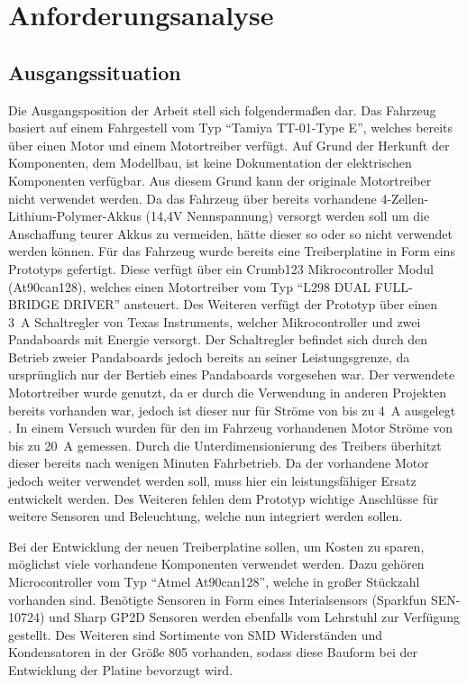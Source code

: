 
\chapter{Anforderungsanalyse}

\section{Ausgangssituation}
Die Ausgangsposition der Arbeit stell sich folgendermaßen dar. Das Fahrzeug basiert auf einem Fahrgestell vom Typ ``Tamiya TT-01-Type E'', welches bereits über einen Motor und einem Motortreiber verfügt.
Auf Grund der Herkunft der Komponenten, dem Modellbau, ist keine
Dokumentation der elektrischen Komponenten verfügbar.
Aus diesem Grund kann der originale Motortreiber nicht verwendet werden.
Da das Fahrzeug über bereits vorhandene 4-Zellen-Lithium-Polymer-Akkus (14,4V Nennspannung) versorgt werden soll um die Anschaffung teurer Akkus zu vermeiden,
hätte dieser so oder so nicht verwendet werden können. 
Für das Fahrzeug wurde bereits eine Treiberplatine in Form eins Prototyps gefertigt.
Diese verfügt über ein Crumb123 Mikrocontroller Modul (At90can128), welches einen Motortreiber vom Typ ``L298 DUAL FULL-BRIDGE DRIVER'' ansteuert.
Des Weiteren verfügt der Prototyp über einen \SI{3}{\A} Schaltregler von Texas Instruments, welcher Mikrocontroller und zwei Pandaboards mit Energie versorgt. 
Der Schaltregler befindet sich durch den Betrieb zweier Pandaboards jedoch bereits an seiner Leistungsgrenze, da ursprünglich nur der Bertieb eines Pandaboards
vorgesehen war. Der verwendete Motortreiber wurde genutzt, da er durch die Verwendung in anderen Projekten bereits vorhanden war, jedoch ist dieser 
nur für Ströme von bis zu \SI{4}{\A} ausgelegt \cite{L298}. In einem Versuch wurden für den im Fahrzeug vorhandenen Motor Ströme von bis zu \SI{20}{\A} gemessen. 
Durch die Unterdimensionierung des Treibers überhitzt dieser bereits nach wenigen Minuten Fahrbetrieb.
Da der vorhandene Motor jedoch weiter verwendet werden soll, muss hier ein leistungsfähiger Ersatz 
entwickelt werden. Des Weiteren fehlen dem Prototyp wichtige Anschlüsse für weitere Sensoren und Beleuchtung, welche nun integriert werden sollen. 

Bei der Entwicklung der neuen Treiberplatine sollen, um Kosten zu sparen, möglichst viele vorhandene Komponenten verwendet werden. Dazu gehören
Microcontroller vom Typ ``Atmel At90can128'', welche in großer Stückzahl vorhanden sind. Benötigte Sensoren in Form eines Interialsensors (Sparkfun SEN-10724)
und Sharp GP2D Sensoren werden ebenfalls vom Lehrstuhl zur Verfügung gestellt. Des Weiteren sind Sortimente von SMD Widerständen und
Kondensatoren in der Größe 805 vorhanden, sodass diese Bauform bei der Entwicklung der Platine bevorzugt wird.


